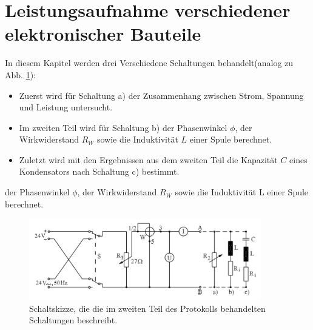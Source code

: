 \section[Leistungsaufnahme]{Leistungsaufnahme verschiedener elektronischer Bauteile}
In diesem Kapitel werden  drei Verschiedene Schaltungen behandelt(analog zu Abb. \ref{fig:Leistungsaufnahme}):
\begin{itemize}
	\item Zuerst wird für Schaltung a) der Zusammenhang zwischen Strom, Spannung und Leistung untersucht.
	\item Im zweiten Teil wird für Schaltung b) der Phasenwinkel $\phi$, der Wirkwiderstand $R_W$ sowie die Induktivität $L$ einer Spule	 berechnet.
	\item Zuletzt wird mit den Ergebnissen aus dem zweiten Teil die Kapazität $C$ eines Kondensators nach Schaltung c) bestimmt.
\end{itemize}

der Phasenwinkel $\phi$, der Wirkwiderstand $R_W$ sowie die Induktivität L einer Spule berechnet.
\begin{figure}[h]
	\centering
	\includegraphics[width=0.9\textwidth]{res/Schaltskizze.png}
	\caption{Schaltskizze, die die im zweiten Teil des Protokolls behandelten Schaltungen beschreibt.\cite{lw}}
	\label{fig:Leistungsaufnahme}
\end{figure}

